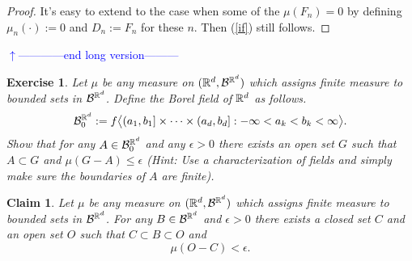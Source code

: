 \documentclass[10pt,letterpaper,twocolumn]{article}
\newtheorem{claim}{Claim}
\newtheorem{exercise}{Exercise}
\begin{document}
{\begin{proof}
It's easy to extend to the case when some of the $\mu(F_n)=0$ by defining $\mu_n (\cdot):=0$ and $D_n:=F_n$ for these $n$. Then (\ref{if}) still follows.
\end{proof}

%
{\flushleft\textcolor{blue}{$\uparrow$------------end long version---------}}\newline
} \fi




\begin{exercise} 
\label{l2}
Let $\mu$ be any measure on $(\Bbb R^d,\mathcal B^{\Bbb R^d})$ which assigns finite measure to bounded sets in $\mathcal B^{\Bbb R^d}$.
Define the Borel field of $\Bbb R^d$ as follows.
\begin{align*} 
\mathcal B_0^{\Bbb R^d}:= f\bigl\langle (a_1,b_1]\times \cdots \times (a_d,b_d]: -\infty< a_k < b_k<\infty \bigr\rangle.
 \end{align*}
Show that for any  $A\in \mathcal B_0^{\Bbb R^d}$ and any $\epsilon>0$ there exists an open set $G$ such that $A\subset G$ and $\mu(G-A)\leq \epsilon$ 
(Hint:  Use a characterization of fields and simply make sure the boundaries of $A$ are finite).
\end{exercise}





\begin{claim} 
\label{oir}
Let $\mu$ be any measure on $(\Bbb R^d,\mathcal B^{\Bbb R^d})$ which assigns finite measure to bounded sets in $\mathcal B^{\Bbb R^d}$.
For any  $B\in\mathcal B^{\Bbb R^d}$ and $\epsilon>0$ there exists a closed set $C$ and an open set $O$ such that $C\subset B\subset O$ and 
\[\mathcal \mu(O-C)<\epsilon.\]
\end{claim}
\end{document}
